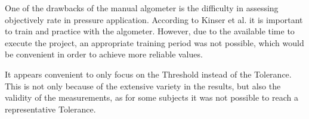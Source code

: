 One of the drawbacks of the manual algometer is the difficulty in assessing objectively rate in pressure application. %
According to Kinser et al. \cite{Kinser2009} it is important to train and practice with the algometer.  However, due to the available time to execute the project, an appropriate training period was not possible, which would be convenient in order to achieve  more reliable values.




It appears convenient to only focus on the Threshold instead of the Tolerance. This is not only because of the extensive variety in the results, but also the validity of the measurements, as for some subjects it was not possible to reach a representative Tolerance.

